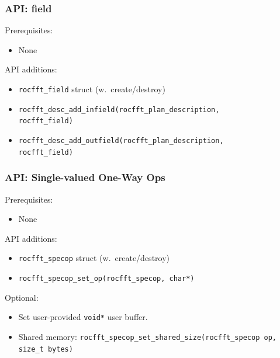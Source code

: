\documentclass[10pt,aspectratio=169]{beamer}
\begin{document}
\begin{frame}
  \frametitle{API: field}

  Prerequisites:
  \begin{itemize}
  \item None
  \end{itemize}

  \bigskip
  
  API additions:
  \begin{itemize}
  \item \texttt{rocfft_field} struct (w.\ create/destroy)
  \item \lstinline{rocfft_desc_add_infield(rocfft_plan_description,
                                      rocfft_field)}
  \item \lstinline{rocfft_desc_add_outfield(rocfft_plan_description,
                                      rocfft_field)}
  \end{itemize}

  
\end{frame}
 
\begin{frame}
  \frametitle{API: Single-valued One-Way Ops}
  
  Prerequisites:
  \begin{itemize}
  \item None
  \end{itemize}

  \bigskip

  API additions:
  \begin{itemize}
  \item \texttt{rocfft_specop} struct (w.\ create/destroy)
  \item \lstinline{rocfft_specop_set_op(rocfft_specop, char*)}
  \end{itemize}
  
  

  \smallskip
  
  Optional:
  \begin{itemize}
  \item Set user-provided \lstinline{void*} user buffer.
  \item Shared memory: \lstinline{rocfft_specop_set_shared_size(rocfft_specop op, size_t bytes)}
  \end{itemize}
  
\end{frame}
\end{document}
